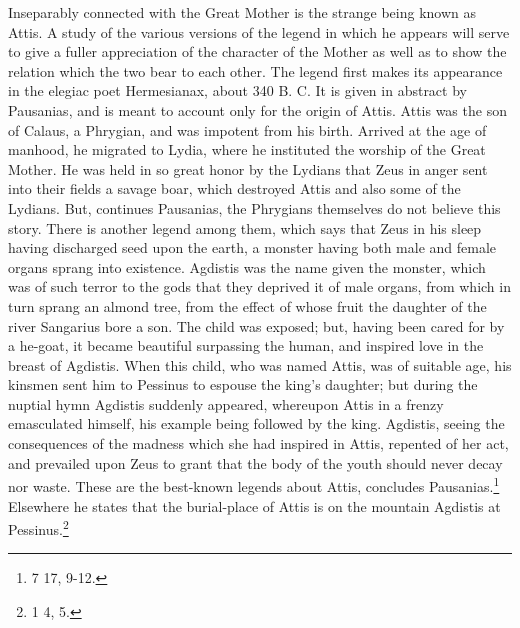 \documentclass[a4paper, 11pt, oneside, polutonikogreek, english]{article}
\begin{document}
Inseparably connected with the Great Mother is the strange being known as Attis. A study of the various versions of the legend in which he appears will serve to give a fuller appreciation of the character of the Mother as well as to show the relation which the two bear to each other. The legend first makes its appearance in the elegiac poet Hermesianax, about 340 B. C. It is given in abstract by Pausanias, and is meant to account only for the origin of Attis. Attis was the son of Calaus, a Phrygian, and was impotent from his birth. Arrived at the age of manhood, he migrated to Lydia, where he instituted the worship of the Great Mother. He was held in so great honor by the Lydians that Zeus in anger sent into their fields a savage boar, which destroyed Attis and also some of the Lydians. But, continues Pausanias, the Phrygians themselves do not believe this story. There is another legend among them, which says that Zeus in his sleep having discharged seed upon the earth, a monster having both male and female organs sprang into existence. Agdistis was the name given the monster, which was of such terror to the gods that they deprived it of male organs, from which in turn sprang an almond tree, from the effect of whose fruit the daughter of the river Sangarius bore a son. The child was exposed; but, having been cared for by a he-goat, it became beautiful surpassing the human, and inspired love in the breast of Agdistis. When this child, who was named Attis, was of suitable age, his kinsmen sent him to Pessinus to espouse the king's daughter; but during the nuptial hymn Agdistis suddenly appeared, whereupon Attis in a frenzy emasculated himself, his example being followed by the king. Agdistis, seeing the consequences of the madness which she had inspired in Attis, repented of her act, and prevailed upon Zeus to grant that the body of the youth should never decay nor waste. These are the best-known legends about Attis, concludes Pausanias.\footnote{7 17, 9-12.} Elsewhere he states that the burial-place of Attis is on the mountain Agdistis at Pessinus.\footnote{1 4, 5.}
\end{document}
